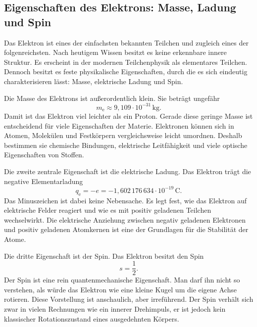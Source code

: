 \subsection{Eigenschaften des Elektrons: Masse, Ladung und Spin}
\label{sec:eigenschaften-elektron}

Das Elektron ist eines der einfachsten bekannten Teilchen und zugleich
eines der folgenreichsten. Nach heutigem Wissen besitzt es keine erkennbare innere
Struktur. Es erscheint in der modernen Teilchenphysik als
elementares Teilchen. Dennoch besitzt es feste physikalische
Eigenschaften, durch die es sich eindeutig charakterisieren lässt: Masse,
elektrische Ladung und Spin.

Die Masse des Elektrons ist außerordentlich klein. Sie beträgt ungefähr
\[
m_\mathrm{e} \approx 9{,}109 \cdot 10^{-31}\,\mathrm{kg}.
\]
Damit ist das Elektron viel leichter als ein Proton. Gerade diese geringe
Masse ist entscheidend für viele Eigenschaften der Materie. Elektronen können sich in
Atomen, Molekülen und Festkörpern
vergleichsweise leicht umordnen. Deshalb bestimmen sie chemische Bindungen,
elektrische Leitfähigkeit und viele optische Eigenschaften von Stoffen.

Die zweite zentrale Eigenschaft ist die elektrische Ladung. Das Elektron trägt die
negative Elementarladung
\[
q_\mathrm{e} = -e
= -1{,}602\,176\,634 \cdot 10^{-19}\,\mathrm{C}.
\]
Das Minuszeichen ist dabei keine Nebensache. Es legt fest, wie das Elektron auf
elektrische Felder reagiert und wie es mit positiv geladenen
Teilchen wechselwirkt. Die elektrische Anziehung zwischen negativ geladenen Elektronen
und positiv geladenen Atomkernen ist eine der Grundlagen für die
Stabilität der Atome.

Die dritte Eigenschaft ist der Spin. Das Elektron besitzt den Spin
\[
s = \frac{1}{2}.
\]
Der Spin ist eine rein quantenmechanische Eigenschaft. Man darf ihn nicht so verstehen,
als würde das Elektron wie eine kleine Kugel um die eigene Achse rotieren. Diese
Vorstellung ist anschaulich, aber irreführend. Der Spin verhält sich zwar in vielen
Rechnungen wie ein innerer Drehimpuls, er ist jedoch kein klassischer
Rotationszustand eines ausgedehnten Körpers.

